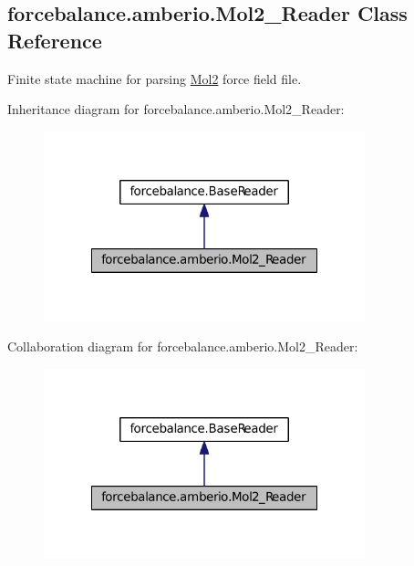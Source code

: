 \hypertarget{classforcebalance_1_1amberio_1_1Mol2__Reader}{\subsection{forcebalance.\-amberio.\-Mol2\-\_\-\-Reader \-Class \-Reference}
\label{classforcebalance_1_1amberio_1_1Mol2__Reader}
}


\-Finite state machine for parsing \hyperlink{namespaceforcebalance_1_1Mol2}{\-Mol2} force field file.  




\-Inheritance diagram for forcebalance.\-amberio.\-Mol2\-\_\-\-Reader\-:\nopagebreak
\begin{figure}[H]
\begin{center}
\leavevmode
\includegraphics[width=264pt]{classforcebalance_1_1amberio_1_1Mol2__Reader__inherit__graph}
\end{center}
\end{figure}


\-Collaboration diagram for forcebalance.\-amberio.\-Mol2\-\_\-\-Reader\-:\nopagebreak
\begin{figure}[H]
\begin{center}
\leavevmode
\includegraphics[width=264pt]{classforcebalance_1_1amberio_1_1Mol2__Reader__coll__graph}
\end{center}
\end{figure}
